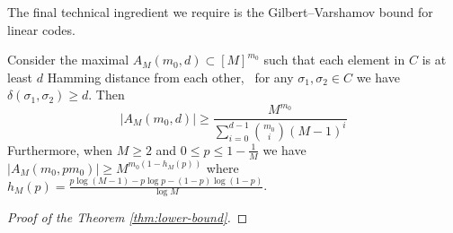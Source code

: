 The final technical ingredient we require is the Gilbert–Varshamov bound for linear codes. 
\begin{lemma}
\label{lemma:Gilbert–Varshamov}
   Consider the maximal $A_M(m_0, d) \subset [M]^{m_0}$ such that each element in $C$ is at least $d$ Hamming distance from each other, \ie\ for any $\sigma_1 , \sigma_2\in C$ we have $\delta(\sigma_1 , \sigma_2) \ge d$. Then 
   \[
 \textstyle   |A_M(m_0, d)| \ge \frac{M^{m_0}}{\sum_{i = 0}^{d-1} {m_0 \choose i} (M-1)^i }
   \]
    Furthermore, when $M\ge 2$ and $0 \le p \le 1 - \frac1M$ we have $|A_M(m_0, pm_0 )| \ge M^{m_0 (1 - h_{M}(p))}$ where $h_{M}(p) =  \frac{p \log(M - 1) - p\log p - (1 - p)\log(1 - p)}{\log M}$. 
\end{lemma}
\begin{proof}[Proof of the Theorem \ref{thm:lower-bound}]

    

\end{proof}
